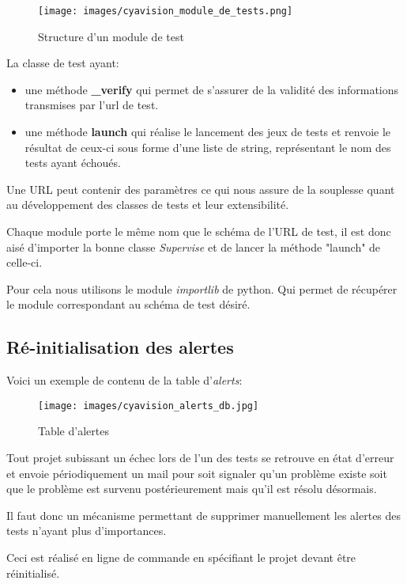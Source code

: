 \begin{figure}[h!]
	\centering
	\texttt{[image: images/cyavision\_module\_de\_tests.png]}
	\caption{Structure d'un module de test}
\end{figure}

La classe de test ayant:
\begin{itemize}
\item  une méthode \textbf{\_verify} qui permet de s'assurer de la validité des informations transmises par l'url de test.
\item une méthode \textbf{launch} qui réalise le lancement des jeux  de tests et renvoie le résultat de ceux-ci sous forme d'une liste de string, représentant le nom des tests ayant échoués.
\end{itemize}

Une URL peut contenir des paramètres ce qui nous assure de la souplesse quant au développement des classes de tests et leur extensibilité.

Chaque module porte le même nom que le schéma de l'URL de test, il est donc aisé d'importer la bonne classe \textit{Supervise} et de lancer la méthode "launch" de celle-ci.

Pour cela nous utilisons le module \textit{importlib} de python. Qui permet de récupérer le module correspondant au schéma de test désiré.

\newpage

\subsection*{Ré-initialisation des alertes}

Voici un exemple de contenu de la table d'\textit{alerts}:

\begin{figure}[h!]
	\centering
	\texttt{[image: images/cyavision\_alerts\_db.jpg]}
	\caption{Table d'alertes}
\end{figure}

Tout projet subissant un échec lors de l'un des tests se retrouve en état d'erreur et envoie périodiquement un mail pour soit signaler qu'un problème existe soit que le problème est survenu postérieurement mais qu'il est résolu désormais. 

Il faut donc un mécanisme permettant de supprimer manuellement les alertes des tests n'ayant plus d'importances.

Ceci est réalisé en ligne de commande en spécifiant le projet devant être réinitialisé.

